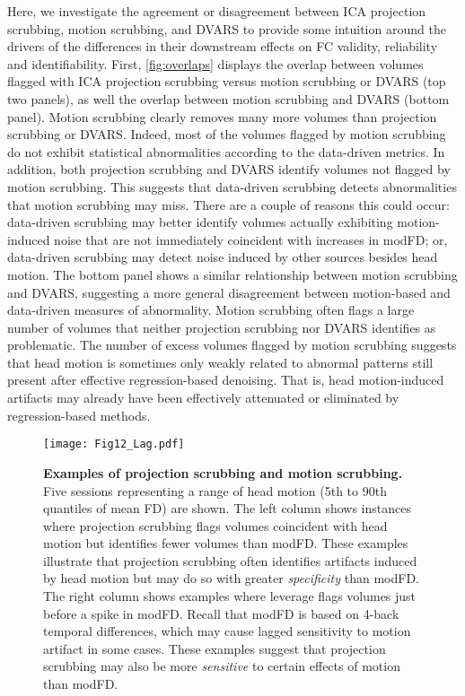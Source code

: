 \documentclass{article}
\begin{document}
Here, we investigate the agreement or disagreement between ICA projection scrubbing, motion scrubbing, and DVARS to provide some intuition around the drivers of the differences in their downstream effects on FC validity, reliability and identifiability.  First, \autoref{fig:overlaps} displays the overlap between volumes flagged with ICA projection scrubbing versus motion scrubbing or DVARS (top two panels), as well the overlap between motion scrubbing and DVARS (bottom panel). %
Motion scrubbing clearly removes many more volumes than projection scrubbing or DVARS. Indeed, most of the volumes flagged by motion scrubbing do not exhibit statistical abnormalities according to the data-driven metrics. In addition, both projection scrubbing and DVARS identify volumes not flagged by motion scrubbing. This suggests that data-driven scrubbing detects abnormalities that motion scrubbing may miss. There are a couple of reasons this could occur: data-driven scrubbing may better identify volumes actually exhibiting motion-induced noise that are not immediately coincident with increases in modFD; or, data-driven scrubbing may detect noise induced by other sources besides head motion. The bottom panel shows a similar relationship between motion scrubbing and DVARS, suggesting a more general disagreement between motion-based and data-driven measures of abnormality. Motion scrubbing often flags a large number of volumes that neither projection scrubbing nor DVARS identifies as problematic. The number of excess volumes flagged by motion scrubbing suggests that head motion is sometimes only weakly related to abnormal patterns still present after effective regression-based denoising. That is, head motion-induced artifacts may already have been effectively attenuated or eliminated by regression-based methods. 

\begin{figure}
    \centering
    \hspace{-1in}\texttt{[image: Fig12\_Lag.pdf]}
    \caption{\small \textbf{Examples of projection scrubbing and motion scrubbing.} Five sessions representing a range of head motion (5th to 90th quantiles of mean FD) are shown. The left column shows instances where projection scrubbing flags volumes coincident with head motion but identifies fewer volumes than modFD. These examples illustrate that projection scrubbing often identifies artifacts induced by head motion but may do so with greater \textit{specificity} than modFD. The right column shows examples where leverage flags volumes just before a spike in modFD. Recall that modFD is based on 4-back temporal differences, which may cause lagged sensitivity to motion artifact in some cases. These examples suggest that projection scrubbing may also be more \textit{sensitive} to certain effects of motion than modFD.} 
    \label{fig:Lag}
\end{figure}
\end{document}
